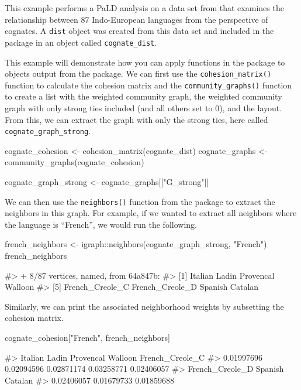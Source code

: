 This example performs a PaLD analysis on a data set from \citet{dyen92}
that examines the relationship between 87 Indo-European languages from
the perspective of cognates. A \texttt{dist} object was created from
this data set and included in the  package in an object
called \texttt{cognate\_dist}.

This example will demonstrate how you can apply functions in the
 package to objects output from the 
package. We can first use the \texttt{cohesion\_matrix()} function to
calculate the cohesion matrix and the \texttt{community\_graphs()}
function to create a list with the weighted community graph, the
weighted community graph with only strong ties included (and all others
set to 0), and the layout. From this, we can extract the graph with only
the strong ties, here called \texttt{cognate\_graph\_strong}.

\begin{Schunk}
\begin{Sinput}
cognate_cohesion <- cohesion_matrix(cognate_dist)
cognate_graphs <- community_graphs(cognate_cohesion)

cognate_graph_strong <- cognate_graphs[["G_strong"]]
\end{Sinput}
\end{Schunk}

We can then use the \texttt{neighbors()} function from the
 package to extract the neighbors in this graph. For
example, if we wanted to extract all neighbors where the language is
``French'', we would run the following.

\begin{Schunk}
\begin{Sinput}
french_neighbors <- igraph::neighbors(cognate_graph_strong, "French")
french_neighbors
\end{Sinput}
\begin{Soutput}
#> + 8/87 vertices, named, from 64a847b:
#> [1] Italian         Ladin           Provencal       Walloon        
#> [5] French_Creole_C French_Creole_D Spanish         Catalan
\end{Soutput}
\end{Schunk}

Similarly, we can print the associated neighborhood weights by
subsetting the cohesion matrix.

\begin{Schunk}
\begin{Sinput}
cognate_cohesion["French", french_neighbors]
\end{Sinput}
\begin{Soutput}
#>         Italian           Ladin       Provencal         Walloon French_Creole_C 
#>      0.01997696      0.02094596      0.02871174      0.03258771      0.02406057 
#> French_Creole_D         Spanish         Catalan 
#>      0.02406057      0.01679733      0.01859688
\end{Soutput}
\end{Schunk}

